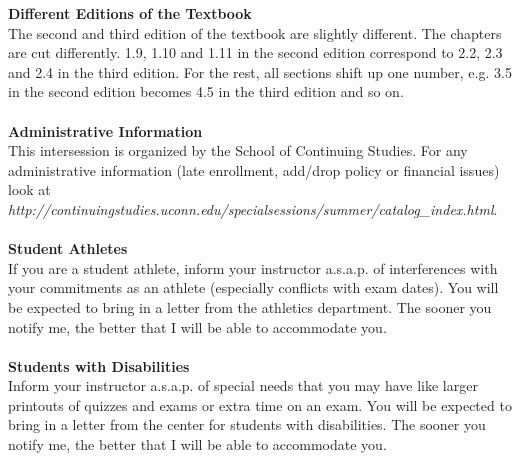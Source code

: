 \documentclass [11pt]{article}
\begin{document}
   \vfill\eject

   {\bf Different Editions of the Textbook} \\
   The second and third edition of the textbook are slightly different. The chapters are cut
   differently. 1.9, 1.10 and 1.11 in the second edition correspond to 2.2, 2.3 and 2.4 in the
   third edition.  For the rest, all sections shift up one number, e.g. 3.5 in the second edition
   becomes 4.5 in the third edition and so on. \\
   \ \\
 
   {\bf Administrative Information} \\
   This intersession is organized by the School of Continuing Studies. For any administrative
   information (late enrollment, add/drop policy or financial issues) look at \\
   {\it http://continuingstudies.uconn.edu/specialsessions/summer/catalog\_index.html}. \\
   \ \\
 
   {\bf Student Athletes}\\
   If you are a student athlete, inform your instructor a.s.a.p. of
   interferences with your commitments as an athlete (especially
   conflicts with exam dates). You will be expected to bring in a
   letter from the athletics department. The sooner you notify me, the
   better that I will be able to accommodate you.\\
   \ \\

   {\bf Students with Disabilities}\\
   Inform your instructor a.s.a.p. of special needs that you may have like
   larger printouts of quizzes and exams or extra time on an exam.
   You will be expected to bring in a letter from the center for students 
   with disabilities. The sooner you notify me, the better that I will 
   be able to accommodate you.\\
   \ \\
\end{document}
